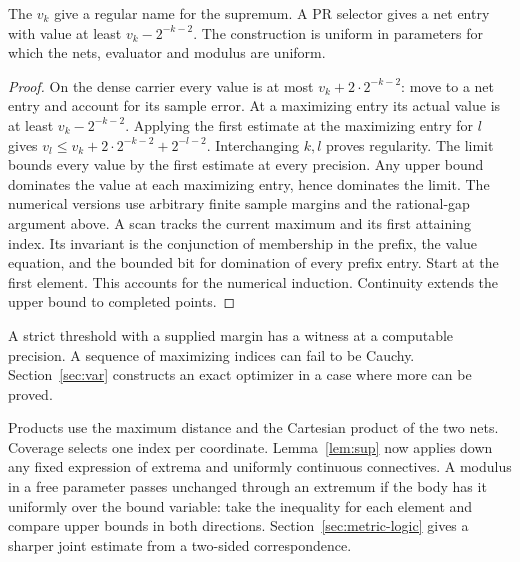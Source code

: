 \begin{lemma}\label{lem:sup}
The $v_k$ give a regular name for the supremum. A PR selector gives a net entry with value at least $v_k-2^{-k-2}$. The construction is uniform in parameters for which the nets, evaluator and modulus are uniform.
\end{lemma}
\begin{proof}
On the dense carrier every value is at most $v_k+2\cdot2^{-k-2}$: move to a net entry and account for its sample error. At a maximizing entry its actual value is at least $v_k-2^{-k-2}$. Applying the first estimate at the maximizing entry for $l$ gives $v_l\le v_k+2\cdot2^{-k-2}+2^{-l-2}$. Interchanging $k,l$ proves regularity. The limit bounds every value by the first estimate at every precision. Any upper bound dominates the value at each maximizing entry, hence dominates the limit. The numerical versions use arbitrary finite sample margins and the rational-gap argument above. A scan tracks the current maximum and its first attaining index. Its invariant is the conjunction of membership in the prefix, the value equation, and the bounded bit for domination of every prefix entry. Start at the first element. This accounts for the numerical induction. Continuity extends the upper bound to completed points.
\end{proof}

A strict threshold with a supplied margin has a witness at a computable precision. A sequence of maximizing indices can fail to be Cauchy. Section~\ref{sec:var} constructs an exact optimizer in a case where more can be proved.

Products use the maximum distance and the Cartesian product of the two nets. Coverage selects one index per coordinate. Lemma~\ref{lem:sup} now applies down any fixed expression of extrema and uniformly continuous connectives. A modulus in a free parameter passes unchanged through an extremum if the body has it uniformly over the bound variable: take the inequality for each element and compare upper bounds in both directions. Section~\ref{sec:metric-logic} gives a sharper joint estimate from a two-sided correspondence.

